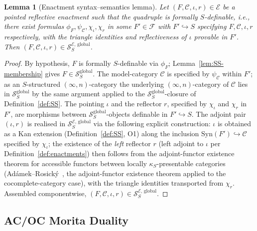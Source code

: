 \documentclass[11pt]{article}
\theoremstyle{plain}
\newtheorem{lemma}[theorem]{Lemma}
\theoremstyle{definition}
\newcommand{\cS}{\mathcal{S}}
\newcommand{\cF}{\mathcal{F}}
\newcommand{\cC}{\mathcal{C}}
\newcommand{\Syn}{\mathrm{Syn}}
\newcommand{\cE}{\mathcal{E}}
\newcommand{\SSEglobal}{\cS_{S}^{\cE,\,\mathrm{global}}}
\begin{document}
\begin{lemma}[Enactment syntax--semantics lemma]\label{lem:SS-membership-E}
Let $(F, \cC, \iota, r) \in \cE$ be a pointed reflective enactment such that the quadruple is formally $S$-definable, i.e., there exist formulas $\phi_F, \psi_\cC, \chi_\iota, \chi_r$ in some $F' \in \cF$ with $F' \hookrightarrow S$ specifying $F, \cC, \iota, r$ respectively, with the triangle identities and reflectiveness of $\iota$ provable in $F'$. Then $(F, \cC, \iota, r) \in \SSEglobal$.
\end{lemma}

\begin{proof}
By hypothesis, $F$ is formally $S$-definable via $\phi_F$; Lemma~\ref{lem:SS-membership} gives $F \in \cS_S^{\mathrm{global}}$. The model-category $\cC$ is specified by $\psi_\cC$ within $F'$; as an $S$-structured $(\infty, n)$-category the underlying $(\infty, n)$-category of $\cC$ lies in $\cS_S^{\mathrm{global}}$ by the same argument applied to the $\cS_S^{\mathrm{global}}$-closure of Definition~\ref{def:SS}. The pointing $\iota$ and the reflector $r$, specified by $\chi_\iota$ and $\chi_r$ in $F'$, are morphisms between $\cS_S^{\mathrm{global}}$-objects definable in $F' \hookrightarrow S$. The adjoint pair $(\iota, r)$ is realised in $\SSEglobal$ via the following explicit construction: $\iota$ is obtained as a Kan extension (Definition~\ref{def:SS}, O1) along the inclusion $\Syn(F') \hookrightarrow \cC$ specified by $\chi_\iota$; the existence of the \emph{left} reflector $r$ (left adjoint to $\iota$ per Definition~\ref{def:enactments}) then follows from the adjoint-functor existence theorem for accessible functors between locally $\kappa_S$-presentable categories (Ad\'amek--Rosick\'y~\cite{AdamekRosicky1994}, the adjoint-functor existence theorem applied to the cocomplete-category case), with the triangle identities transported from $\chi_r$. Assembled componentwise, $(F, \cC, \iota, r) \in \SSEglobal$.
\end{proof}

\subsection{AC/OC Morita Duality}
\end{document}
